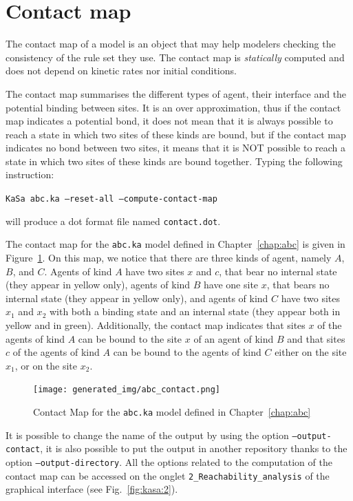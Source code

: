\documentclass[11pt]{book}
\def\ttt#1{\texttt{#1}}
\begin{document}
\section{Contact map}

The contact map of a model is an object that may help modelers checking the consistency of the rule set they use. The contact map is \emph{statically} computed and does not depend on kinetic rates nor initial conditions.

The contact map summarises the different types of agent, their interface and the potential binding between sites. It is an over approximation, thus if the contact map indicates a potential bond, it does not mean that it is always possible to reach a state in which two sites of these kinds are bound, but if the contact map indicates no bond between two sites, it means that it is NOT possible to reach a state in which two sites of these kinds are bound together.  
Typing the following instruction:

\texttt{KaSa abc.ka --reset-all --compute-contact-map}

will produce a dot format file named \texttt{contact.dot}. 

The contact map for the \ttt{abc.ka} model  defined in Chapter~\ref{chap:abc} is given in Figure~\ref{fig:abc-contact}. On this map, we notice that there are three kinds of agent, namely $A$, $B$, and $C$. 
Agents of kind $A$ have two sites $x$ and $c$, that bear no internal state (they appear in yellow only), agents of kind $B$ have one site $x$, that bears no internal state (they appear in yellow only), and agents of kind $C$ have two sites $x_1$ and $x_2$ with both a binding state and an internal state (they appear both in yellow and in green). 
Additionally, the contact map indicates that sites $x$ of the agents of kind $A$ can be bound to the site $x$ of an agent of kind $B$ and that sites $c$ of the agents of kind $A$ can be bound to the agents of kind $C$ either on the site $x_1$, or on the site $x_2$. 

\begin{figure}[htbp]
\centering
\texttt{[image: generated\_img/abc\_contact.png]}
\caption{Contact Map for the \ttt{abc.ka} model defined in Chapter~\ref{chap:abc}}
\label{fig:abc-contact}
\end{figure}

It is possible to change the name of the output by using the option \ttt{--output-contact}, it is also possible to put the output in another repository thanks to the option \ttt{--output-directory}. All the options related to the computation of the contact map can be accessed on the 
onglet \texttt{2\_Reachability\_analysis} of the graphical interface (see Fig.~\ref{fig:kasa:2}). 
\end{document}
